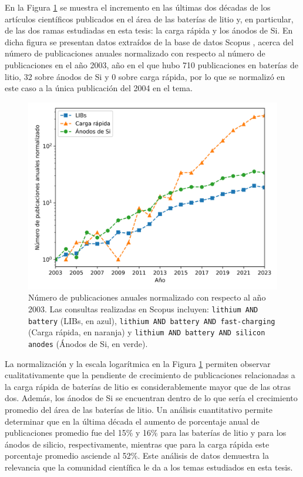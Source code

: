 En la Figura \ref{fig:scopus} se muestra el incremento en las últimas dos décadas
de los artículos científicos publicados en el área de las baterías de litio y, en 
particular, de las dos ramas estudiadas en esta tesis: la carga rápida y los 
ánodos de Si. En dicha figura se presentan datos extraídos de la base de datos 
Scopus \cite{SCOPUS}, acerca del número de publicaciones anuales normalizado con respecto 
al número de publicaciones en el año 2003, año en el que hubo 710 publicaciones 
en baterías de litio, 32 sobre ánodos de Si y 0 sobre carga rápida, por lo que 
se normalizó en este caso a la única publicación del 2004 en el tema.
\begin{figure}[h!]
    \centering
    \includegraphics[width=.8\textwidth]{Introduccion/baterias/scopus.png}
    \caption{Número de publicaciones anuales normalizado con respecto al año 2003. 
    Las consultas realizadas en Scopus \cite{SCOPUS} incluyen: 
    \texttt{lithium AND battery} (LIBs, en azul), \texttt{lithium AND battery AND 
    fast-charging} (Carga rápida, en naranja) y \texttt{lithium AND battery AND 
    silicon anodes} (Ánodos de Si, en verde).}
    \label{fig:scopus}
\end{figure}
La normalización y la escala logarítmica en la Figura \ref{fig:scopus} permiten
observar cualitativamente que la pendiente de crecimiento de publicaciones 
relacionadas a la carga rápida de baterías de litio es considerablemente mayor que 
de las otras dos. Además, los ánodos de Si se encuentran dentro de lo que sería
el crecimiento promedio del área de las baterías de litio. Un análisis 
cuantitativo permite determinar que en la última década el aumento de porcentaje
anual de publicaciones promedio fue del 15\% y 16\% para las baterías de litio 
y para los ánodos de silicio, respectivamente, mientras que para la carga rápida 
este porcentaje promedio asciende al 52\%. Este análisis de datos demuestra la relevancia
que la comunidad científica le da a los temas estudiados en esta tesis.

